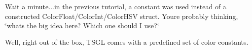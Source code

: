 Wait a minute...in the previous tutorial, a constant was used instead of a constructed Color\+Float/\+Color\+Int/\+Color\+H\+S\+V struct. You\textquotesingle{}re probably thinking, \char`\"{}what\textquotesingle{}s the big idea here? Which one should I use?\char`\"{}

Well, right out of the box, T\+S\+G\+L comes with a predefined set of color constants. 